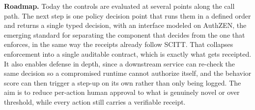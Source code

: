 \documentclass[10pt]{article}
\begin{document}
\textbf{Roadmap.} Today the controls are evaluated at several points along the call path. The next step is one policy decision point that runs them in a defined order and returns a single typed decision, with an interface modeled on AuthZEN, the emerging standard for separating the component that decides from the one that enforces, in the same way the receipts already follow SCITT. That collapses enforcement into a single auditable contract, which is exactly what gets receipted. It also enables defense in depth, since a downstream service can re-check the same decision so a compromised runtime cannot authorize itself, and the behavior score can then trigger a step-up on its own rather than only being logged. The aim is to reduce per-action human approval to what is genuinely novel or over threshold, while every action still carries a verifiable receipt.
\end{document}
